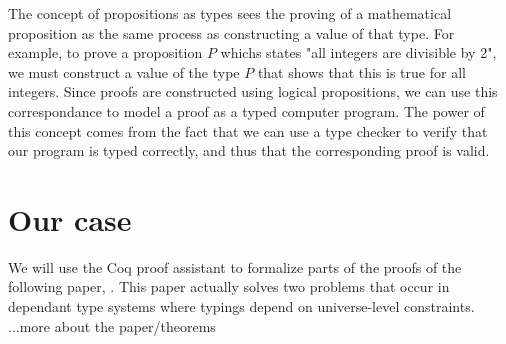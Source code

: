 \documentclass[a4paper,14pt]{article}
\begin{document}
The concept of propositions as types sees the proving of a mathematical proposition
as the same process as constructing a value of that type. For example, to prove a proposition $P$ whichs states "all integers are divisible by 2",
we must construct a value of the type $P$ that shows that this is true for all integers.
Since proofs are constructed using logical propositions, we can use this correspondance
to model a proof as a typed computer program.
The power of this concept comes from the fact that we can use a type checker to verify that
our program is typed correctly, and thus that the corresponding proof is valid.

\section{Our case}

We will use the Coq proof assistant to formalize parts of the proofs of the following paper, \textit{\citeauthor{mbezem}}.
This paper actually solves two problems that occur in dependant type systems where typings depend
on universe-level constraints.
\\

...more about the paper/theorems







\newpage
\printbibliography
\end{document}
